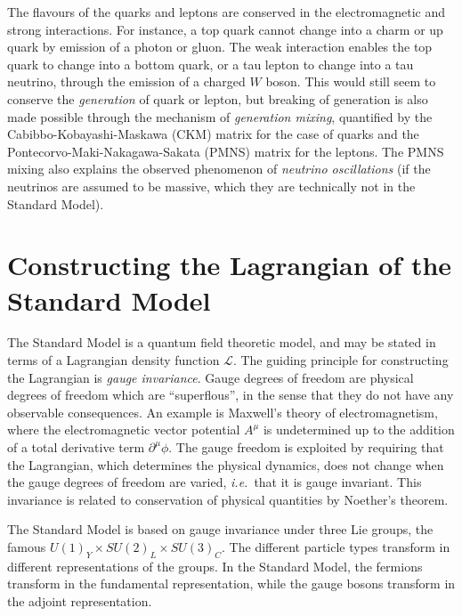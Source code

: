 \documentclass[twoside,english]{uiofysmaster}
\begin{document}
The flavours of the quarks and leptons are conserved in the electromagnetic and strong interactions. For instance, a top quark cannot change into a charm or up quark by emission of a photon or gluon. The weak interaction enables the top quark to change into a bottom quark, or a tau lepton to change into a tau neutrino, through the emission of a charged $W$ boson. This would still seem to conserve the {\it generation} of quark or lepton, but breaking of generation is also made possible through the mechanism of {\it generation mixing}, quantified by the Cabibbo-Kobayashi-Maskawa (CKM) matrix for the case of quarks and the Pontecorvo-Maki-Nakagawa-Sakata (PMNS) matrix for the leptons. The PMNS mixing also explains the observed phenomenon of {\it neutrino oscillations} (if the neutrinos are assumed to be massive, which they are technically not in the Standard Model).

\section{Constructing the Lagrangian of the Standard Model}

The Standard Model is a quantum field theoretic model, and may be stated in terms of a Lagrangian density function $\mathcal{L}$. The guiding principle for constructing the Lagrangian is {\it gauge invariance}. Gauge degrees of freedom are physical degrees of freedom which are ``superflous'', in the sense that they do not have any observable consequences. An example is Maxwell's theory of electromagnetism, where the electromagnetic vector potential $A^\mu$ is undetermined up to the addition of a total derivative term $\partial^\mu \phi$. The gauge freedom is exploited by requiring that the Lagrangian, which determines the physical dynamics, does not change when the gauge degrees of freedom are varied, {\it i.e.}\ that it is gauge invariant. This invariance is related to conservation of physical quantities by Noether's theorem.

The Standard Model is based on gauge invariance under three Lie groups, the famous $U(1)_Y\times SU(2)_L\times SU(3)_C$. The different particle types transform in different representations of the groups. In the Standard Model, the fermions transform in the fundamental representation, while the gauge bosons transform in the adjoint representation.
\end{document}
